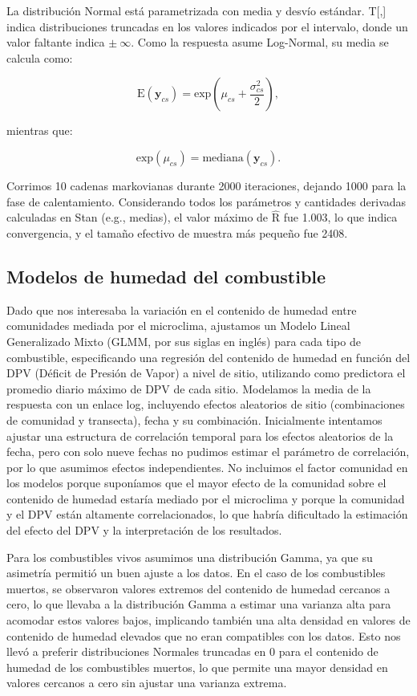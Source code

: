 La distribución Normal está parametrizada con media y desvío estándar. T[,] indica distribuciones truncadas en los valores indicados por el intervalo, donde un valor faltante indica $\pm \ \infty$. Como la respuesta asume Log-Normal, su media se calcula como:

\[
\text{E}(\textbf{y}_{cs}) = \text{exp}\left(\mu_{cs} + \frac{\sigma_{cs}^2}{2}\right),
\]

mientras que:

\[
\text{exp}(\mu_{cs}) = \text{mediana}(\textbf{y}_{cs}).
\]

Corrimos 10 cadenas markovianas durante 2000 iteraciones, dejando 1000 para la fase de calentamiento. Considerando todos los parámetros y cantidades derivadas calculadas en Stan (e.g., medias), el valor máximo de $\hat{\text{R}}$ fue 1.003, lo que indica convergencia, y el tamaño efectivo de muestra más pequeño fue 2408.  

\subsection{Modelos de humedad del combustible}\label{append:moisture-models}

Dado que nos interesaba la variación en el contenido de humedad entre comunidades mediada por el microclima, ajustamos un Modelo Lineal Generalizado Mixto (GLMM, por sus siglas en inglés) para cada tipo de combustible, especificando una regresión del contenido de humedad en función del DPV (Déficit de Presión de Vapor) a nivel de sitio, utilizando como predictora el promedio diario máximo de DPV de cada sitio. Modelamos la media de la respuesta con un enlace log, incluyendo efectos aleatorios de sitio (combinaciones de comunidad y transecta), fecha y su combinación. Inicialmente intentamos ajustar una estructura de correlación temporal para los efectos aleatorios de la fecha, pero con solo nueve fechas no pudimos estimar el parámetro de correlación, por lo que asumimos efectos independientes. No incluimos el factor comunidad en los modelos porque suponíamos que el mayor efecto de la comunidad sobre el contenido de humedad estaría mediado por el microclima y porque la comunidad y el DPV están altamente correlacionados, lo que habría dificultado la estimación del efecto del DPV y la interpretación de los resultados.  

Para los combustibles vivos asumimos una distribución Gamma, ya que su asimetría permitió un buen ajuste a los datos. En el caso de los combustibles muertos, se observaron valores extremos del contenido de humedad cercanos a cero, lo que llevaba a la distribución Gamma a estimar una varianza alta para acomodar estos valores bajos, implicando también una alta densidad en valores de contenido de humedad elevados que no eran compatibles con los datos. Esto nos llevó a preferir distribuciones Normales truncadas en 0 para el contenido de humedad de los combustibles muertos, lo que permite una mayor densidad en valores cercanos a cero sin ajustar una varianza extrema.  

